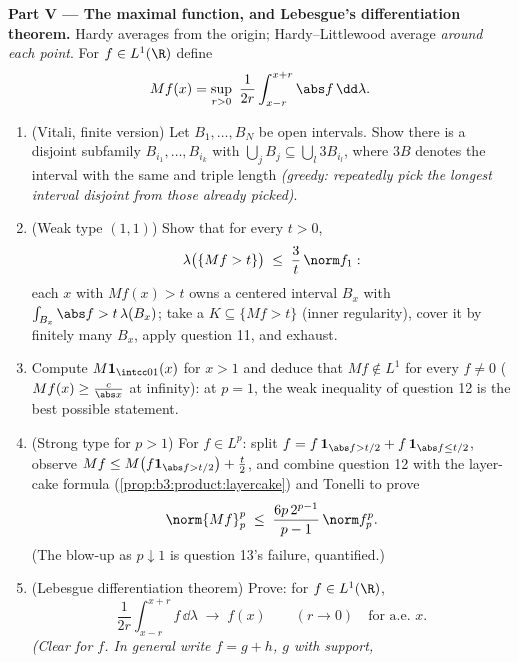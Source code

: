 \begin{problem}
\medskip
\noindent\textbf{Part V --- The maximal function, and
Lebesgue's differentiation theorem.} Hardy averages from the
origin; Hardy--Littlewood average \emph{around each point}.
For $f \in L^1(\R)$ define
\[
Mf(x) = \sup_{r>0}\ \frac1{2r}\int_{x-r}^{x+r}\abs
f\,\dd\lambda .
\]
\begin{enumerate}[resume]
  \item (Vitali, finite version) Let $B_1, \dots, B_N$ be
        open intervals. Show there is a disjoint subfamily
        $B_{i_1}, \dots, B_{i_k}$ with $\bigcup_jB_j
        \subseteq \bigcup_l3B_{i_l}$, where $3B$ denotes the
        interval with the same  and triple length
        \emph{(greedy: repeatedly pick the longest interval
        disjoint from those already picked)}.
  \item (Weak type $(1,1)$) Show that for every $t > 0$,
        \[
        \lambda\bigl(\{Mf > t\}\bigr) \;\leq\;
        \frac3t\,\norm f_1 :
        \]
        each $x$ with $Mf(x) > t$ owns a centered interval
        $B_x$ with $\int_{B_x}\abs f > t\,\lambda(B_x)$; take
        a  $K \subseteq \{Mf > t\}$ (inner regularity),
        cover it by finitely many $B_x$, apply question 11,
        and exhaust.
  \item Compute $M\mathbf 1_{\intcc01}(x)$ for $x > 1$ and
        deduce that $Mf \notin L^1$ for every $f \neq 0$
        ($Mf(x) \geq \frac c{\abs x}$ at infinity): at $p =
        1$, the weak inequality of question 12 is the best
        possible statement.
  \item (Strong type for $p > 1$) For $f \in L^p$: split $f =
        f\,\mathbf 1_{\abs f > t/2} + f\,\mathbf 1_{\abs f
        \leq t/2}$, observe $Mf \leq M\bigl(f\mathbf 1_{\abs
        f > t/2}\bigr) + \frac t2$, and combine question 12
        with the layer-cake formula
        (\cref{prop:b3:product:layercake}) and Tonelli to
        prove
        \[
        \norm{Mf}_p^p \;\leq\;
        \frac{6p\,2^{p-1}}{p-1}\,\norm f_p^p .
        \]
        (The blow-up as $p \downarrow 1$ is question 13's
        failure, quantified.)
  \item (Lebesgue differentiation theorem) Prove: for $f \in
        L^1(\R)$,
        \[
        \frac1{2r}\int_{x-r}^{x+r}f\,\dd\lambda
        \;\longrightarrow\; f(x)
        \qquad (r \to 0)\quad\text{for a.e.\ }x .
        \]
        \emph{(Clear for  $f$. In general write $f
        = g + h$, $g$  with  support,
}
\end{enumerate}
\end{problem}
